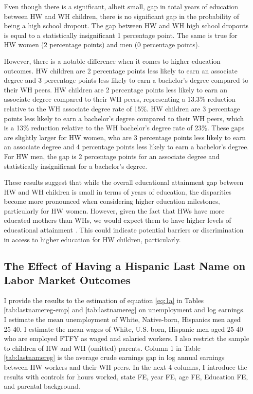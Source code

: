Even though there is a significant, albeit small, gap in total years of education between HW and WH children, there is no significant gap in the probability of being a high school dropout. The gap between HW and WH high school dropouts is equal to a statistically insignificant 1 percentage point. The same is true for HW women (2 percentage points) and men (0 percentage points).

However, there is a notable difference when it comes to higher education outcomes. HW children are 2 percentage points less likely to earn an associate degree and 3 percentage points less likely to earn a bachelor's degree compared to their WH peers. HW children are 2 percentage points less likely to earn an associate degree compared to their WH peers, representing a 13.3\% reduction relative to the WH associate degree rate of 15\%. HW children are 3 percentage points less likely to earn a bachelor's degree compared to their WH peers, which is a 13\% reduction relative to the WH bachelor's degree rate of 23\%. These gaps are slightly larger for HW women, who are 3 percentage points less likely to earn an associate degree and 4 percentage points less likely to earn a bachelor's degree. For HW men, the gap is 2 percentage points for an associate degree and statistically insignificant for a bachelor's degree.

These results suggest that while the overall educational attainment gap between HW and WH children is small in terms of years of education, the disparities become more pronounced when considering higher education milestones, particularly for HW women. However, given the fact that HWs have more educated mothers than WHs, we would expect them to have higher levels of educational attainment \autocite{kimball2009risk, gould2020does}. This could indicate potential barriers or discrimination in access to higher education for HW children, particularly.

\subsection{The Effect of Having a Hispanic Last Name on Labor Market Outcomes}

I provide the results to the estimation of equation \ref{eq:1a} in Tables \ref{tab:lastnamereg-emp} and \ref{tab:lastnamereg} on unemployment and log earnings. I estimate the mean unemployment of White, Native-born, Hispanics men aged 25-40. I estimate the mean wages of White, U.S.-born, Hispanic men aged 25-40 who are employed FTFY as waged and salaried workers. I also restrict the sample to children of HW and WH (omitted) parents. Column 1 in Table \ref{tab:lastnamereg} is the average crude earnings gap in log annual earnings between HW workers and their WH peers. In the next 4 columns, I introduce the results with controls for hours worked, state FE, year FE, age FE, Education FE, and parental background. 

